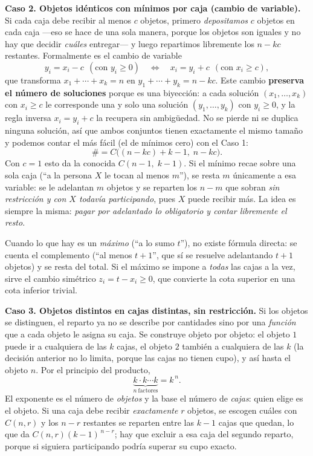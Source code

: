 \documentclass[11pt]{article}
\begin{document}
\begin{teo}
\medskip
\textbf{Caso 2. Objetos idénticos con mínimos por caja (cambio de variable).}
Si cada caja debe recibir al menos $c$ objetos, primero \emph{depositamos} $c$ objetos en cada caja —eso se hace de una sola manera, porque los objetos son iguales y no hay que decidir \emph{cuáles} entregar— y luego repartimos libremente los $n-kc$ restantes. Formalmente es el cambio de variable
\[
y_i=x_i-c\ \ (\text{con } y_i\ge 0)\quad\Longleftrightarrow\quad x_i=y_i+c\ \ (\text{con } x_i\ge c),
\]
que transforma $x_1+\cdots+x_k=n$ en $y_1+\cdots+y_k=n-kc$. Este cambio \textbf{preserva el número de soluciones} porque es una biyección: a cada solución $(x_1,\ldots,x_k)$ con $x_i\ge c$ le corresponde una y solo una solución $(y_1,\ldots,y_k)$ con $y_i\ge 0$, y la regla inversa $x_i=y_i+c$ la recupera sin ambigüedad. No se pierde ni se duplica ninguna solución, así que ambos conjuntos tienen exactamente el mismo tamaño y podemos contar el más fácil (el de mínimos cero) con el Caso 1:
\[
\#=C\bigl((n-kc)+k-1,\;n-kc\bigr).
\]
Con $c=1$ esto da la conocida $C(n-1,\;k-1)$. Si el mínimo recae sobre una sola caja (``a la persona $X$ le tocan al menos $m$''), se resta $m$ únicamente a esa variable: se le adelantan $m$ objetos y se reparten los $n-m$ que sobran \emph{sin restricción y con $X$ todavía participando}, pues $X$ puede recibir más.
La idea es siempre la misma: \emph{pagar por adelantado lo obligatorio y contar libremente el resto}.

Cuando lo que hay es un \emph{máximo} (``a lo sumo $t$''), no existe fórmula directa: se cuenta el complemento (``al menos $t+1$'', que sí se resuelve adelantando $t+1$ objetos) y se resta del total. Si el máximo se impone a \emph{todas} las cajas a la vez, sirve el cambio simétrico $z_i=t-x_i\ge0$, que convierte la cota superior en una cota inferior trivial.

\medskip
\textbf{Caso 3. Objetos distintos en cajas distintas, sin restricción.}
Si los objetos se distinguen, el reparto ya no se describe por cantidades sino por una \emph{función} que a cada objeto le asigna su caja. Se construye objeto por objeto: el objeto $1$ puede ir a cualquiera de las $k$ cajas, el objeto $2$ también a cualquiera de las $k$ (la decisión anterior no lo limita, porque las cajas no tienen cupo), y así hasta el objeto $n$. Por el principio del producto,
\[
\underbrace{k\cdot k\cdots k}_{n\ \text{factores}}=k^{\,n}.
\]
El exponente es el número de \emph{objetos} y la base el número de \emph{cajas}: quien elige es el objeto. Si una caja debe recibir \emph{exactamente} $r$ objetos, se escogen cuáles con $C(n,r)$ y los $n-r$ restantes se reparten entre las $k-1$ cajas que quedan, lo que da $C(n,r)(k-1)^{\,n-r}$; hay que excluir a esa caja del segundo reparto, porque si siguiera participando podría superar su cupo exacto.


\end{teo}
\end{document}
